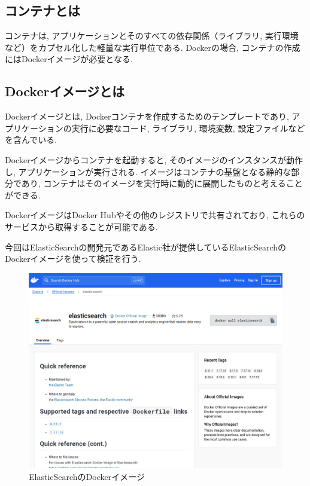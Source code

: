 \documentclass[a4j,12pt,]{jarticle}
\begin{document}
\subsection{コンテナとは}

コンテナは, アプリケーションとそのすべての依存関係（ライブラリ, 実行環境など）をカプセル化した軽量な実行単位である.
Dockerの場合, コンテナの作成にはDockerイメージが必要となる.

\subsection{Dockerイメージとは}

Dockerイメージとは, Dockerコンテナを作成するためのテンプレートであり, アプリケーションの実行に必要なコード, ライブラリ, 環境変数, 設定ファイルなどを含んでいる.

Dockerイメージからコンテナを起動すると, そのイメージのインスタンスが動作し, アプリケーションが実行される. イメージはコンテナの基盤となる静的な部分であり, コンテナはそのイメージを実行時に動的に展開したものと考えることができる.

DockerイメージはDocker Hubやその他のレジストリで共有されており, これらのサービスから取得することが可能である.

今回はElasticSearchの開発元であるElastic社が提供しているElasticSearchのDockerイメージを使って検証を行う.

\begin{figure}[H]
  \begin{center}
    \includegraphics[width=160mm]{elasticsearch-image.png}
    \caption{ElasticSearchのDockerイメージ}
    \label{s0}
  \end{center}
\end{figure}
\end{document}
